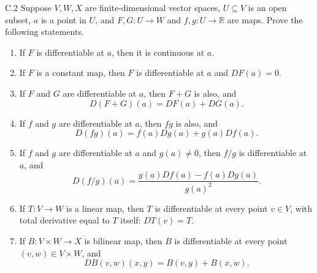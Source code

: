 \begin{exercise}{C.2}
    Suppose \( V, W, X \) are finite-dimensional vector spaces, \( U \subseteq V \) is an open subset, \( a \) is a point in \( U \), and \( F, G: U \to W \) and \( f, g: U \to \mathbb{R} \) are maps. Prove the following statements.
    \begin{enumerate}[itemsep=0pt,label={(\alph*)}]
        \item If \( F \) is differentiable at \( a \), then it is continuous at \( a \).
        \item If \( F \) is a constant map, then \( F \) is differentiable at \( a \) and \( DF(a) = 0 \).
        \item If \( F \) and \( G \) are differentiable at \( a \), then \( F + G \) is also, and
              \[
                  D(F + G)(a) = DF(a) + DG(a).
              \]
        \item If \( f \) and \( g \) are differentiable at \( a \), then \( fg \) is also, and
              \[
                  D(fg)(a) = f(a)Dg(a) + g(a)Df(a).
              \]
        \item If \( f \) and \( g \) are differentiable at \( a \) and \( g(a) \ne 0 \), then \( f/g \) is differentiable at \( a \), and
              \[
                  D(f/g)(a) = \dfrac{g(a)Df(a) - f(a)Dg(a)}{{g(a)}^{2}}.
              \]
        \item If \( T: V \to W \) is a linear map, then \( T \) is differentiable at every point \( v \in V \), with total derivative equal to \( T \) itself: \( DT(v) = T \).
        \item If \( B: V \times W \to X \) is bilinear map, then \( B \) is differentiable at every point \( (v, w) \in V \times W \), and
              \[
                  DB(v, w)(x, y) = B(v, y) + B(x, w).
              \]
    \end{enumerate}
\end{exercise}

